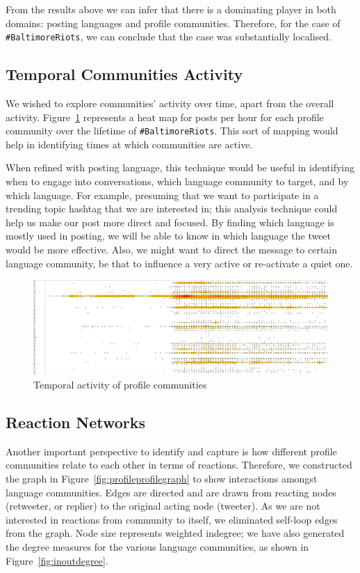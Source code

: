 \documentclass[conference]{IEEEtran}
\begin{document}
From the results above we can infer that there is a dominating player
in both domains: posting languages and profile communities. Therefore,
for the case of {\texttt{\#BaltimoreRiots}}, we can conclude that the case was
substantially localised.


\subsection{Temporal Communities Activity}

We wished to explore communities' activity over time, apart from the
overall activity. Figure~\ref{fig:heatmap} represents a heat map for
posts per hour for each profile community over the lifetime of
{\texttt{\#BaltimoreRiots}}. This sort of mapping would help in
identifying times at which communities are active.

When refined with posting language, this technique would be useful in
identifying when to engage into conversations, which language
community to target, and by which language. For example, presuming
that we want to participate in a trending topic hashtag that we are
interested in; this analysis technique could help us make our post
more direct and focused. By finding which language is mostly used in
posting, we will be able to know in which language the tweet would be
more effective. Also, we might want to direct the message to certain
language community, be that to influence a very active or re-activate
a quiet one.

\begin{figure}[!h]
\centering
\includegraphics[width=\textwidth]{images/heatmap.png}
\caption{Temporal activity of profile communities}
\label{fig:heatmap}
\end{figure}


\subsection{Reaction Networks}

Another important perspective to identify and capture is how different
profile communities relate to each other in terms of
reactions. Therefore, we constructed the graph in
Figure~\ref{fig:profileprofilegraph} to show interactions amongst
language communities. Edges are directed and are drawn from reacting
nodes (retweeter, or replier) to the original acting node
(tweeter). As we are not interested in reactions from community to
itself, we eliminated self-loop edges from the graph. Node size
represents weighted indegree; we have also generated the degree
measures for the various language communities, as shown in
Figure~\ref{fig:inoutdegree}.
\end{document}
